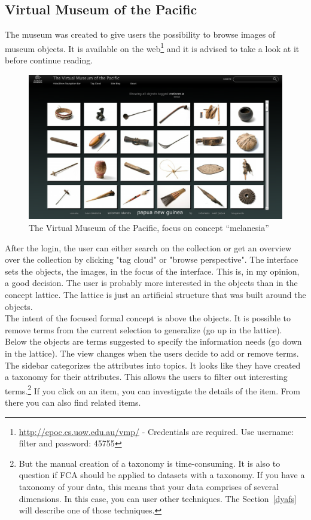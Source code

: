 \documentclass[11pt]{report}
\begin{document}
\subsection{Virtual Museum of the Pacific}
\label{Museum}
 
The museum was created to give users the possibility to browse images of museum objects. It is available on the web\footnote{\url{http://epoc.cs.uow.edu.au/vmp/} - Credentials are required. Use username: filter and password: 45755} and it is advised to take a look at it before continue reading. \\

\begin{figure}[!ht]
	\centering
	\includegraphics[width=\linewidth]{images/pacific}
\caption{The Virtual Museum of the Pacific, focus on concept ``melanesia''}
\label{figure:pacific}
\end{figure}

After the login, the user can either search on the collection or get an overview over the collection by clicking "tag cloud" or "browse perspective". The interface sets the objects, the images, in the focus of the interface. This is, in my opinion, a good decision. The user is probably more interested in the objects than in the concept lattice. The lattice is just an artificial structure that was built around the objects. \\
 
The intent of the focused formal concept is above the objects. It is possible to remove terms from the current selection to generalize (go up in the lattice). Below the objects are terms suggested to specify the information needs (go down in the lattice). The view changes when the users decide to add or remove terms. The sidebar categorizes the attributes into topics. It looks like they have created a taxonomy for their attributes. This allows the users to filter out interesting terms.\footnote{But the manual creation of a taxonomy is time-consuming. It is also to question if FCA should be applied to datasets with a taxonomy. If you have a taxonomy of your data, this means that your data comprises of several dimensions. In this case, you can user other techniques. The Section~\ref{dyafs} will describe one of those techniques.} If you click on an item, you can investigate the details of the item. From there you can also find related items.\\
 
\end{document}
